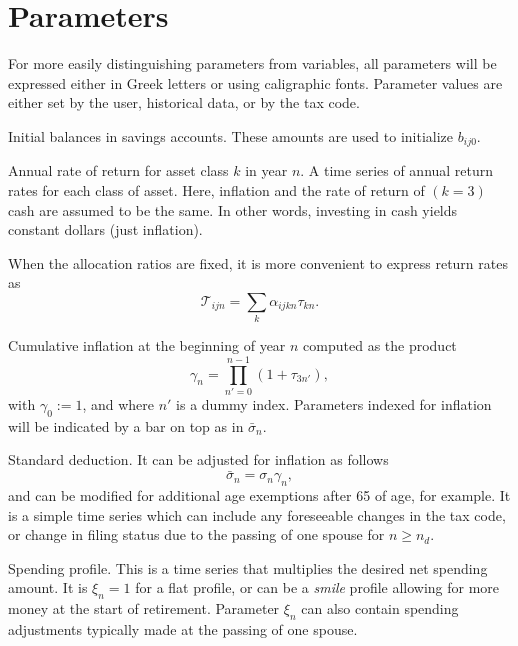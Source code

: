 \documentclass{report}[fleqn,12pt]
\begin{document}
\section{Parameters}
For more easily distinguishing parameters from variables, all parameters will be expressed either in Greek letters
or using caligraphic fonts.
Parameter values are either set by the user, historical data, or by the tax code.
\begin{description}[leftmargin=4em,style=multiline]
\item [$\beta{ij}$]
	Initial balances in savings accounts. These amounts are used to initialize $b_{ij0}$.
\item [$\tau_{kn}$]
	Annual rate of return for asset class $k$ in year $n$.
	A time series of annual return rates for each class of asset.
	Here, inflation and the rate of return of $(k=3)$ cash are assumed to be the same.
	In other words, investing in cash yields constant dollars (just inflation).
\item[$\mathcal{T}_{ijn}$]
	When the allocation ratios are fixed, it is more convenient to express return rates as
	\begin{equation}
		\mathcal{T}_{ijn} = \sum_k \alpha_{ijkn} \tau_{kn}.
	\end{equation}
\item [$\gamma_n$]
	Cumulative inflation at the beginning of year $n$ computed as the product
	\begin{equation}
		\gamma_n = \prod_{n' = 0}^{n-1} (1 + \tau_{3n'}),
	\end{equation}
	with $\gamma_0 := 1$, and where $n'$ is a dummy index.
	Parameters indexed for inflation will be indicated by a bar on top as in $\bar\sigma_n$.
\item [$\sigma_n$]
	Standard deduction. It can be adjusted for inflation as follows
	\begin{equation}
		\bar\sigma_n = \sigma_n \gamma_n,
	\end{equation}
	and can be modified for additional age exemptions after 65 of age, for example.
	It is a simple time series
	which can include any foreseeable changes in the tax code, or change in filing status due to the
	passing of one spouse for $n\ge n_d$.
\item [$\xi_{n}$]
	Spending profile. This is a time series that multiplies the desired net spending amount.
	It is $\xi_n =1$ for
	a flat profile, or can be a {\em smile} profile allowing for more money at the start
	of retirement. Parameter
	$\xi_n$ can also contain spending adjustments typically made at the passing of one spouse.

\end{description}
\end{document}
